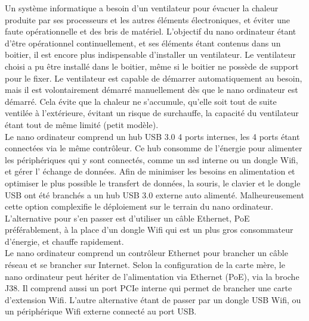 \noindent Un système informatique a besoin d'un ventilateur pour évacuer la chaleur produite par ses processeurs et les autres éléments électroniques, et éviter une faute opérationnelle et des bris de matériel. L'objectif du nano ordinateur étant d'être opérationnel continuellement, et ses éléments étant contenus dans un boitier, il est encore plus indispensable d'installer un ventilateur. Le ventilateur choisi a pu être installé dans le boitier, même si le boitier ne possède de support pour le fixer. Le ventilateur est capable de démarrer automatiquement au besoin, mais il est volontairement démarré manuellement dès que le nano ordinateur est démarré. Cela évite que la chaleur ne s'accumule, qu'elle soit tout de suite ventilée à l'extérieure, évitant un risque de surchauffe, la capacité du ventilateur étant tout de même limité (petit modèle).
\vspace{\baselineskip}
\\
\noindent Le nano ordinateur comprend un hub USB 3.0 4 ports internes, les 4 ports étant connectées via le même contrôleur. Ce hub consomme de l'énergie pour alimenter les périphériques qui y sont connectés, comme un \acrshort{ssd} interne ou un dongle Wifi, et gérer l’ échange de données. Afin de minimiser les besoins en alimentation et optimiser le plus possible le transfert de données, la souris, le clavier et le dongle USB ont été branchés a un hub USB 3.0 externe auto alimenté. Malheureusement cette option complexifie le déploiement sur le terrain du nano ordinateur. L'alternative pour s'en passer est d'utiliser un câble Ethernet, PoE préférablement, à la place d'un dongle Wifi qui est un plus gros consommateur d'énergie, et chauffe rapidement.
\vspace{\baselineskip}
\\
\noindent Le nano ordinateur comprend un contrôleur Ethernet pour brancher un câble réseau et se brancher sur Internet. Selon la configuration de la carte mère, le nano ordinateur peut hériter de l'alimentation via Ethernet (PoE), via la broche J38. Il comprend aussi un port PCIe interne qui permet de brancher une carte d'extension Wifi. L'autre alternative étant de passer par un dongle USB Wifi, ou un périphérique Wifi externe connecté au port USB. 
